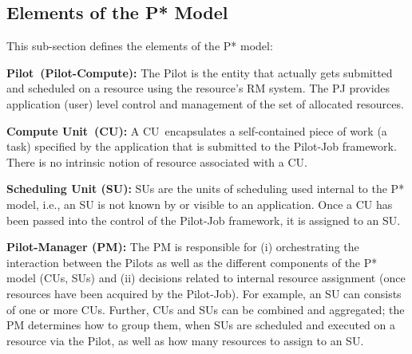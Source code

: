 \documentclass[conference,final]{IEEEtran}
\makeatletter
\def\blueuwave{\bgroup \markoverwith{\lower3.5\p@\hbox{\sixly \textcolor{blue}{\char58}}}\ULon}
\newcommand{\alwave}[1]{ {\blueuwave{#1}}}
\newcommand{\jhanote}[1]{ {\textcolor{red} { ***shantenu: #1 }}}
\newcommand{\alnote}[1]{ {\textcolor{blue} { ***andreL: #1 }}}
\newcommand{\alnote}[1]{}
\newcommand{\jhanote}[1]{}
\newcommand{\pilot}{Pilot\xspace}
\newcommand{\pilots}{Pilots\xspace}
\newcommand{\pilotjob}{Pilot-Job\xspace}
\newcommand{\computeunit}{Compute Unit\xspace}
\newcommand{\cu}{CU\xspace}
\newcommand{\cus}{CUs\xspace}
\newcommand{\sus}{SUs\xspace}
\newcommand{\upp}{\vspace*{-0.5em}}
\makeatother
\begin{document}
%

\noindent 
\subsection{Elements of the P* Model \upp\upp}
\noindent This sub-section defines the elements of the P* model:

\begin{compactitem}
\item \textbf{\pilot \ (Pilot-Compute):} The \pilot is the
  entity that actually gets submitted and scheduled on a resource
  using the resource's RM system. The PJ provides application (user)
  level control and management of the set of allocated resources.



\item \textbf{\computeunit \ (\cu):} A \cu \ encapsulates a self-contained
  piece of work (a task) specified by the application that is
  submitted to the \pilotjob framework.  There is no intrinsic notion
  of resource associated with a \cu.

\item \textbf{Scheduling Unit (SU):} SUs are the units of scheduling
  used internal to the P* model, i.e., an SU is not known by or
  visible to an application. Once a \cu has been
  passed into the control of the \pilotjob framework, it is assigned
  to an SU.

\item \textbf{Pilot-Manager (PM):} The PM is responsible for (i)
  orchestrating the interaction between the \pilots as well as the
  different components of the P* model (\cus, \sus) and (ii) decisions
  related to internal resource assignment (once resources have been
  acquired by the \pilotjob).  For example, an SU can consists of one
  or more \cus. Further, \cus and \sus can be combined and aggregated;
  the PM determines how to group them, when \sus are scheduled and
  executed on a resource via the \pilot, as well as how many resources
  to assign to an SU.


\end{compactitem}
\end{document}
